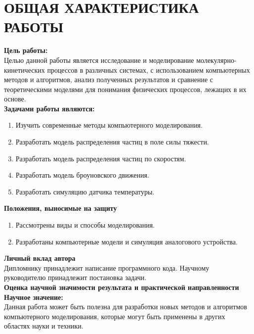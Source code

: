 \chapter*{ОБЩАЯ ХАРАКТЕРИСТИКА РАБОТЫ}
\label{ch:target}

\noindent \textbf{Цель работы:} \\
\indent Целью данной работы является исследование и моделирование молекулярно-кинетических процессов в различных системах, с использованием компьютерных методов и алгоритмов, анализ полученных результатов и сравнение с теоретическими моделями для понимания физических процессов, лежащих в их основе.  \\


\noindent \textbf{Задачами работы являются:}
\begin{enumerate}
    \item Изучить современные методы компьютерного моделирования.
    \item Разработать модель распределения частиц в поле силы тяжести.
    \item Разработать модель распределения частиц по скоростям.
    \item Разработать модель броуновского движения.
    \item Разработать симуляцию датчика температуры.
\end{enumerate}

\noindent \textbf{Положения, выносимые на защиту}
\begin{enumerate}
    \item Рассмотрены виды и способы моделирования.
    \item Разработаны компьютерные модели и симуляция аналогового устройства.
\end{enumerate}

\noindent \textbf{Личный вклад автора} \\
\indent Дипломнику принадлежит написание программного кода. Научному руководителю принадлежит постановка задачи. \\

\noindent \textbf{Оценка научной значимости результата и практической направленности} \\
\indent \textbf{Научное значение:} \\
\indent Данная работа может быть полезна для разработки новых методов и алгоритмов компьютерного моделирования, которые могут быть применены в других областях науки и техники. \\


